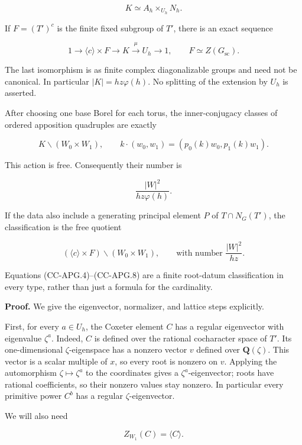 \[
 K \simeq A_h\times_{U_h}N_h.
 \tag{CC-APG.6}
\]

If \(F=(T')^c\) is the finite fixed subgroup of \(T'\), there is an
exact sequence

\[
 1\longrightarrow \langle c\rangle\times F
 \longrightarrow K\xrightarrow{\ \mu\ }U_h
 \longrightarrow1,
 \qquad F\simeq Z(G_{\mathrm{sc}}).
 \tag{CC-APG.7}
\]

The last isomorphism is as finite complex diagonalizable groups and need
not be canonical. In particular \(|K|=hz\varphi(h)\). No splitting of
the extension by \(U_h\) is asserted.

After choosing one base Borel for each torus, the inner-conjugacy
classes of ordered apposition quadruples are exactly

\[
 K\backslash(W_0\times W_1),
 \qquad
 k\cdot(w_0,w_1)=(p_0(k)w_0,p_1(k)w_1).
 \tag{CC-APG.8}
\]

This action is free. Consequently their number is

\[
 \frac{|W|^2}{hz\varphi(h)}.
 \tag{CC-APG.9}
\]

If the data also include a generating principal element \(P\) of
\(T\cap N_G(T')\), the classification is the free quotient

\[
 (\langle c\rangle\times F)\backslash(W_0\times W_1),
 \qquad\text{with number }\frac{|W|^2}{hz}.
 \tag{CC-APG.10}
\]

Equations (CC-APG.4)--(CC-APG.8) are a finite root-datum classification
in every type, rather than just a formula for the cardinality.

\textbf{Proof.} We give the eigenvector, normalizer, and lattice steps
explicitly.

First, for every \(a\in U_h\), the Coxeter element \(C\) has a regular
eigenvector with eigenvalue \(\zeta^a\). Indeed, \(C\) is defined over
the rational cocharacter space of \(T'\). Its one-dimensional
\(\zeta\)-eigenspace has a nonzero vector \(v\) defined over
\(\mathbf Q(\zeta)\). This vector is a scalar multiple of \(x\), so
every root is nonzero on \(v\). Applying the automorphism
\(\zeta\mapsto\zeta^a\) to the coordinates gives a
\(\zeta^a\)-eigenvector; roots have rational coefficients, so their
nonzero values stay nonzero. In particular every primitive power \(C^b\)
has a regular \(\zeta\)-eigenvector.

We will also need

\[
 Z_{W_1}(C)=\langle C\rangle.
 \tag{CC-APG.11}
\]

